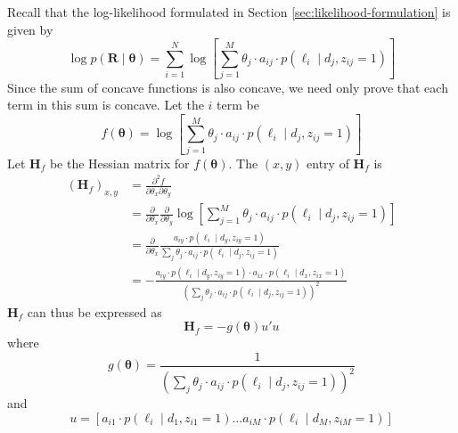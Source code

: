 Recall that the log-likelihood formulated in Section \ref{sec:likelihood-formulation} is given by
\begin{equation}
    \log p(\bm{R}\mid\bm{\theta}) = \sum_{i=1}^N \log \left[\sum_{j=1}^M \theta_j\cdot a_{ij}\cdot p(\ell_i\mid d_j, z_{ij}=1)\right]
\end{equation}
Since the sum of concave functions is also concave, we need only prove that each term in this sum is concave. Let the $i$ term be
\begin{equation}
    f(\bm\theta) = \log \left[\sum_{j=1}^M \theta_j\cdot a_{ij}\cdot p(\ell_i\mid d_j, z_{ij}=1)\right]
\end{equation}
Let $\mathrm{\mathbf{H}}_f$ be the Hessian matrix for $f(\bm\theta)$. The $(x,y)$ entry of $\mathrm{\mathbf{H}}_f$ is 
\begin{equation}
    \begin{split}
        \left(\mathbf{H}_{f}\right)_{x, y} & =\frac{\partial^{2} f}{\partial \theta_{x} \partial \theta_{y}} \\
        & =\frac{\partial}{\partial \theta_{x}} \frac{\partial}{\partial \theta_{y}} \log \left[\sum_{j=1}^{M} \theta_{j} \cdot a_{i j} \cdot p\left(\ell_{i} \mid d_{j}, z_{i j}=1\right)\right] \\
        & =\frac{\partial}{\partial \theta_{x}} \frac{a_{i y} \cdot p\left(\ell_{i} \mid d_{y}, z_{i y}=1\right)}{\sum_{j} \theta_{j} \cdot a_{i j} \cdot p\left(\ell_{i} \mid d_{j}, z_{i j}=1\right)} \\
        & =-\frac{a_{i y} \cdot p\left(\ell_{i} \mid d_{y}, z_{i y}=1\right) \cdot a_{i x} \cdot p\left(\ell_{i} \mid d_{x}, z_{i x}=1\right)}{\left(\sum_{j} \theta_{j} \cdot a_{i j} \cdot p\left(\ell_{i} \mid d_{j}, z_{i j}=1\right)\right)^{2}}
    \end{split}
\end{equation}
$\mathrm{\mathbf{H}}_f$ can thus be expressed as 
\begin{equation}
    \mathrm{\mathbf{H}}_f = -g(\bm\theta)u'u
\end{equation}
where 
\begin{equation}
    g(\boldsymbol{\theta})=\frac{1}{\left(\sum_{j} \theta_{j} \cdot a_{i j} \cdot p\left(\ell_{i} \mid d_{j}, z_{i j}=1\right)\right)^{2}}
\end{equation}
and 
\begin{equation}
    u=\left[a_{i 1} \cdot p\left(\ell_{i} \mid d_{1}, z_{i 1}=1\right) \ldots a_{i M} \cdot p\left(\ell_{i} \mid d_{M}, z_{i M}=1\right)\right]
\end{equation}
